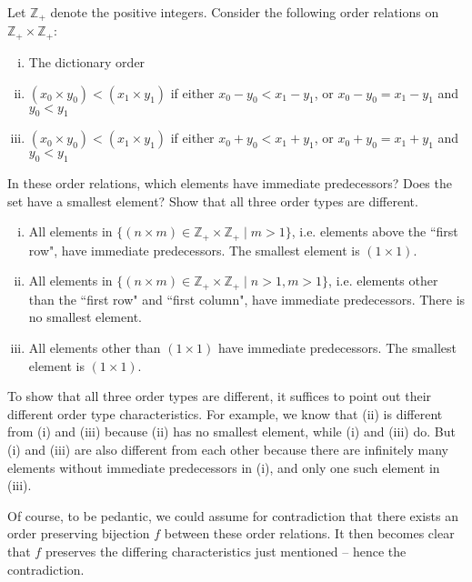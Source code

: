 \documentclass[11pt]{article}
\begin{document}
\begin{ex}{3.12}
  Let $\mathbb{Z}_+$ denote the positive integers. Consider the following order relations on $\mathbb{Z}_+ \times \mathbb{Z}_+$:
  \begin{enumerate}[(i)]
    \item The dictionary order
    \item $(x_0 \times y_0) < (x_1 \times y_1)$ if either $x_0 - y_0 < x_1 -
      y_1$, or $x_0 - y_0 = x_1 - y_1$ and $y_0 < y_1$
    \item $(x_0 \times y_0) < (x_1 \times y_1)$ if either $x_0 + y_0 < x_1 +
      y_1$, or $x_0 + y_0 = x_1 + y_1$ and $y_0 < y_1$
  \end{enumerate}
  In these order relations, which elements have immediate predecessors? Does the set have a smallest element? Show that all three order types are different.
\end{ex}

\begin{solution}


  \begin{enumerate}[(i)]
    \item All elements in $\{ (n \times m) \in \mathbb{Z}_+ \times \mathbb{Z}_+
      \mid m > 1 \}$, i.e. elements above the ``first row", have immediate
      predecessors. The smallest element is $(1 \times 1)$.
    \item All elements in $\{ (n \times m) \in \mathbb{Z}_+ \times \mathbb{Z}_+
      \mid n > 1, m > 1 \}$, i.e. elements other than the ``first row" and
      ``first column", have immediate predecessors. There is no smallest
      element.
    \item All elements other than $(1 \times 1)$ have immediate predecessors.
      The smallest element is $(1 \times 1)$.
  \end{enumerate}

  To show that all three order types are different, it suffices to point
  out their different order type characteristics. For example, we know that
  (ii) is different from (i) and (iii) because (ii) has no smallest element,
  while (i) and (iii) do. But (i) and (iii) are also different from each other
  because there are infinitely many elements without immediate predecessors in
  (i), and only one such element in (iii).

  Of course, to be pedantic, we could assume for contradiction that there
  exists an order preserving bijection $f$ between these order relations. It
  then becomes clear that $f$ preserves the differing characteristics just
  mentioned -- hence the contradiction.
\end{solution}
\end{document}
